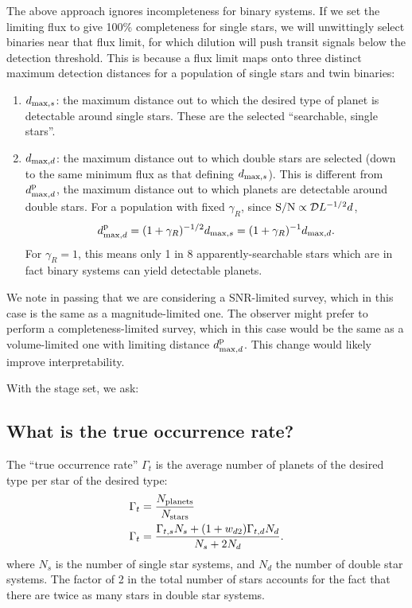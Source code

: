 \documentclass{emulateapj}
\begin{document}
The above approach ignores incompleteness for binary systems.
If we set the limiting flux to give 100\% completeness for single stars, we 
will unwittingly select binaries near that flux limit, for which dilution 
will push transit signals below the detection threshold.
This is because a flux limit maps onto three distinct maximum 
detection distances for a population of single stars and twin binaries:
\begin{enumerate}
\item $d_{{\rm max},s}$: the maximum distance out to which the desired type 
	of planet is detectable around single stars.
	These are the selected ``searchable, single stars''.
%
\item $d_{{\rm max},d}$: the maximum distance out to which double stars
  are selected (down to the same minimum flux as that defining $d_{{\rm 
  max},s}$). 
  This is different from $d_{{\rm max},d}^{\rm p}$, the maximum
  distance out to which planets are detectable around double stars. For a 
  population with fixed  $\gamma_R$, since ${\rm S/N} \propto \mathcal{D} 
  L^{-1/2} d$,
  \begin{equation}
    d_{{\rm max},d}^{\rm p} = (1 + \gamma_R)^{-1/2} d_{{\rm max},s} = 
    (1 + \gamma_R)^{-1} d_{{\rm max},d}.
  \end{equation}
  For $\gamma_R = 1$, this means only 1 in 8 apparently-searchable stars which 
  are in fact binary systems can yield detectable planets.
  
\end{enumerate}

We note in passing that we are considering a SNR-limited survey, which in this 
case is the same as a magnitude-limited one.
The observer might prefer to perform a completeness-limited survey, which in 
this case would be the same as a volume-limited one with limiting distance
$d_{{\rm max},d}^{\rm p}$.
This change would likely improve interpretability.

With the stage set, we ask:

\subsection{What is the true occurrence rate?}
\label{sec:true_rate}

The ``true occurrence rate'' $\Gamma_t$ is the average number of planets of 
the desired type per star of the desired type:
\begin{align}
\Gamma_t &= \frac{N_{\rm planets}}{N_{\rm stars}} \\
\Gamma_t &= \frac{\Gamma_{t,s} N_s + (1+w_{d2}) \Gamma_{t,d} N_d}{N_s + 2N_d}.
\label{eq:true_occ}
\end{align}
where $N_s$ is the number of single star systems, and $N_d$ the number of 
double star systems. 
The factor of 2 in the total number of stars accounts for the fact that there 
are twice as many stars in double star systems.
\end{document}
